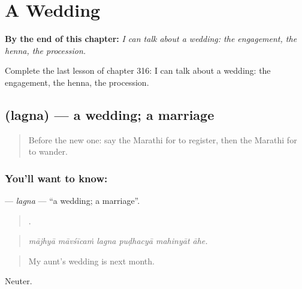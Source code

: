 
\chapter{A Wedding}
\label{ch:mr-a-wedding}

\begin{chapteropening}
\textbf{By the end of this chapter:} \emph{I can talk about a wedding: the engagement, the henna, the procession.}

Complete the last lesson of chapter 316: I can talk about a wedding: the engagement, the henna, the procession.
\end{chapteropening}

\section[\texorpdfstring{\mr{लग्न} (lagna)}{लग्न (lagna)}]{ (lagna) — a wedding; a marriage}

\label{lesson:MR-C316-lagna}



\begin{quote}
Before the new one: say the Marathi for to register, then the Marathi for to wander.
\end{quote}

\subsection*{You'll want to know: }
\textbf{} — \emph{lagna} — \textquotedblleft{}a wedding; a marriage\textquotedblright{}.

\begin{quote}
     .
\end{quote}

\begin{quote}
\emph{mājhyā māvśīcaṁ lagna puḍhacyā mahinyāt āhe.}
\end{quote}

\begin{quote}
My aunt's wedding is next month.
\end{quote}

Neuter.

